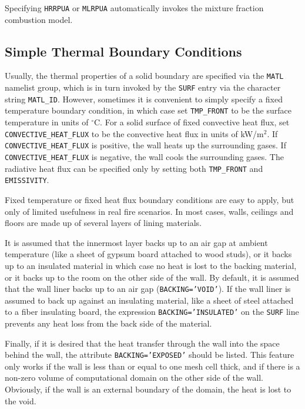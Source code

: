 \documentclass[11pt]{book}
\newcommand{\ct}{\tt\small}
\begin{document}
\begin{warning}
Specifying {\ct HRRPUA} or {\ct MLRPUA} automatically invokes the mixture fraction
combustion model.
\end{warning}



\subsection{Simple Thermal Boundary Conditions}
\label{info:thermalboundary} 

Usually, the thermal properties of a solid boundary are specified via the
{\ct MATL} namelist group, which is in turn invoked by the {\ct SURF} entry via
the character string {\ct MATL\_ID}. However, sometimes it is convenient to
simply specify a fixed temperature boundary condition, in which case set
{\ct TMP\_FRONT} to be the surface temperature in units of $^\circ$C.
For a solid surface of fixed convective heat flux, set {\ct CONVECTIVE\_HEAT\_FLUX} to be
the convective heat flux in units of kW/m$^2$. If {\ct CONVECTIVE\_HEAT\_FLUX} is
positive, the wall heats up the surrounding gases. If {\ct CONVECTIVE\_HEAT\_FLUX}
is negative, the wall cools the surrounding gases. The radiative heat
flux can be specified only by setting both {\ct TMP\_FRONT} and {\ct EMISSIVITY}.

Fixed temperature or fixed heat flux boundary conditions are
easy to apply, but only of limited usefulness in real fire scenarios.
In most cases, walls, ceilings and floors are made up of several layers
of lining materials.

It is assumed that the innermost layer backs up to an air gap at ambient
temperature (like a sheet of gypsum board attached to wood studs), or
it backs up to an insulated material in which case no heat is lost to
the backing material, or it backs up to the room on the other side of
the wall. By default, it is assumed that the wall liner backs up to an air gap
({\ct BACKING='VOID'}). If the wall liner is assumed to back up
against an insulating material, like a sheet of steel attached to a
fiber insulating board, the expression {\ct BACKING='INSULATED'} on
the {\ct SURF} line prevents any heat loss from the back side of the material.

Finally, if it is desired that the heat transfer
through the wall into the space behind the wall, the attribute
{\ct BACKING='EXPOSED'} should be listed. This feature only works
if the wall is less than or equal to one mesh cell thick, and if there is a non-zero volume
of computational domain on the other side of the wall. Obviously, if
the wall is an external boundary of the domain, the heat is lost
to the void.
\end{document}
